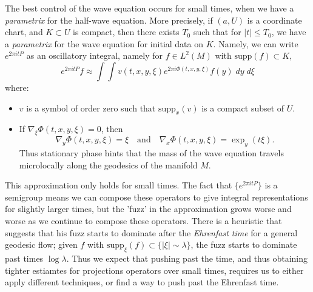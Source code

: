 \documentclass{article}
\theoremstyle{plain}
\theoremstyle{remark}
\theoremstyle{definition}
\begin{document}
The best control of the wave equation occurs for small times, when we have a \emph{parametrix} for the half-wave equation. More precisely, if $(a,U)$ is a coordinate chart, and $K \subset U$ is compact, then there exists $T_0$ such that for $|t| \leq T_0$, we have a \emph{parametrix} for the wave equation for initial data on $K$. Namely, we can write $e^{2 \pi i t P}$ as an oscillatory integral, namely for $f \in L^2(M)$ with $\text{supp}(f) \subset K$,
%
\[ e^{2 \pi i t P} f \approx \int \int v(t,x,y,\xi) e^{2 \pi i \Phi(t,x,y,\xi)} f(y)\; dy\; d\xi \]
%
where:
%
\begin{itemize}
    \item $v$ is a symbol of order zero such that $\text{supp}_x(v)$ is a compact subset of $U$.
    \item If $\nabla_\xi \Phi(t,x,y,\xi) = 0$, then
    \[ \nabla_y \Phi(t,x,y,\xi) = \xi \quad\text{and}\quad \nabla_x \Phi(t,x,y,\xi) = \exp_y( t \xi). \]
    Thus stationary phase hints that the mass of the wave equation travels microlocally along the geodesics of the manifold $M$.
\end{itemize}
%
This approximation only holds for small times. The fact that $\{ e^{2 \pi i t P} \}$ is a semigroup means we can compose these operators to give integral representations for slightly larger times, but the 'fuzz' in the approximation grows worse and worse as we continue to compose these operators. There is a heuristic that suggests that his fuzz starts to dominate after the \emph{Ehrenfast time} for a general geodesic flow; given $f$ with $\text{supp}_\xi(f) \subset \{ |\xi| \sim \lambda \}$, the fuzz starts to dominate past times $\log \lambda$. Thus we expect that pushing past the time, and thus obtaining tighter estiamtes for projections operators over small times, requires us to either apply different techniques, or find a way to push past the Ehrenfast time.
\end{document}
